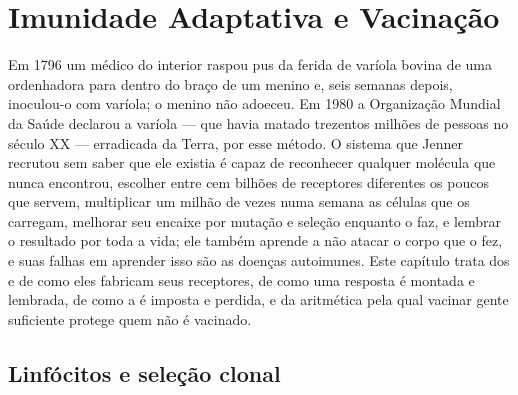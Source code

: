 \chapter{Imunidade Adaptativa e Vacinação}\label{ch:b3:adaptive-immunity}

Em 1796 um médico do interior raspou pus da ferida de varíola bovina de
uma ordenhadora para dentro do braço de um menino e, seis semanas
depois, inoculou-o com varíola; o menino não adoeceu. Em 1980 a
Organização Mundial da Saúde declarou a varíola --- que havia matado
trezentos milhões de pessoas no século XX --- erradicada da Terra, por
esse método. O sistema que Jenner recrutou sem saber que ele existia é
capaz de reconhecer qualquer molécula que nunca encontrou, escolher
entre cem bilhões de receptores diferentes os poucos que servem,
multiplicar um milhão de vezes numa semana as células que os carregam,
melhorar seu encaixe por mutação e seleção enquanto o faz, e lembrar o
resultado por toda a vida; ele também aprende a não atacar o corpo que
o fez, e suas falhas em aprender isso são as doenças autoimunes. Este
capítulo trata dos  e de como eles fabricam seus receptores,
de como uma resposta é montada e lembrada, de como a  é
imposta e perdida, e da aritmética pela qual vacinar gente suficiente
protege quem não é vacinado.

\section{Linfócitos e seleção clonal}

